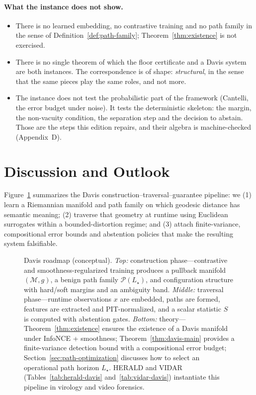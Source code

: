\documentclass[11pt]{article}
\theoremstyle{remark}
\theoremstyle{plain}
\begin{document}
\paragraph{What the instance does not show.}
\begin{itemize}
  \item There is no learned embedding, no contrastive training and no path family in the sense of
    Definition~\ref{def:path-family}; Theorem~\ref{thm:existence} is not exercised.
  \item There is no single theorem of which the floor certificate and a Davis system are both instances. The
    correspondence is of shape: \emph{structural}, in the sense that the same pieces play the same roles, and not
    more.
  \item The instance does not test the probabilistic part of the framework (Cantelli, the error budget under
    noise). It tests the deterministic skeleton: the margin, the non-vacuity condition, the separation step and
    the decision to abstain. Those are the steps this edition repairs, and their algebra is machine-checked
    (Appendix~D).
\end{itemize}

\section{Discussion and Outlook}
\label{sec:discussion}

Figure~\ref{fig:davis-roadmap} summarizes the Davis construction--traversal--guarantee pipeline: we
(1) learn a Riemannian manifold and path family on which geodesic distance has semantic meaning;
(2) traverse that geometry at runtime using Euclidean surrogates within a bounded-distortion regime;
and (3) attach finite-variance, compositional error bounds and abstention policies that make the
resulting system falsifiable.

\begin{figure}[t]
  \centering
  \caption{Davis roadmap (conceptual). \emph{Top:} construction phase---contrastive and
  smoothness-regularized training produces a pullback manifold $(\mathcal{M},g)$, a benign path family
  $\mathcal{P}(L_\star)$, and configuration structure with hard/soft margins and an ambiguity band.
  \emph{Middle:} traversal phase---runtime observations $x$ are embedded, paths are formed, features
  are extracted and PIT-normalized, and a scalar statistic $S$ is computed with abstention gates.
  \emph{Bottom:} theory---Theorem~\ref{thm:existence} ensures the existence of a Davis manifold
  under InfoNCE + smoothness; Theorem~\ref{thm:davis-main} provides a finite-variance detection
  bound with a compositional error budget; Section~\ref{sec:path-optimization} discusses how to
  select an operational path horizon $L_\star$. HERALD and VIDAR (Tables~\ref{tab:herald-davis} and~\ref{tab:vidar-davis}) instantiate this pipeline in virology and video forensics.}
  \label{fig:davis-roadmap}
\end{figure}
\end{document}
